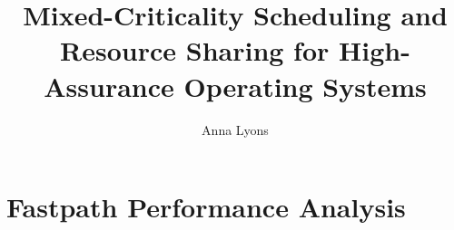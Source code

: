 \documentclass[a4paper,twoside,openright,11pt,oldfontcommands]{memoir}
\title{Mixed-Criticality Scheduling 
      and Resource Sharing for
     High-Assurance Operating Systems}
\author{Anna Lyons}
\let\printglossary\relax
\begin{document}
\frontmatter


\pagestyle{plain}






\tableofcontents
\cleardoublepage
\newpage

\mainmatter

\sloppy

\pagebreak












\backmatter
\cleardoublepage
\listoffigures
\clearpage
\printglossary[type=\acronymtype]
\cleardoublepage

%
%

\clearpage
\appendix
\addappheadtotoc
\section{Fastpath Performance Analysis}






\end{document}
